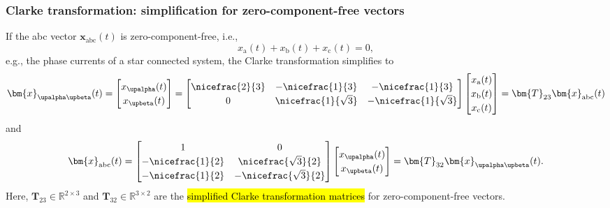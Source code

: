 \begin{frame}
    \frametitle{Clarke transformation: simplification for zero-component-free vectors}
    If the abc vector $\bm{x}_\mathrm{abc}(t)$ is zero-component-free, i.e.,  $$x_\mathrm{a}(t) + x_\mathrm{b}(t) +x_\mathrm{c}(t) = 0,$$
    e.g., the phase currents of a star connected system, \pause the Clarke transformation simplifies to
    \begin{equation}
        \renewcommand{\arraystretch}{1.2}
        \bm{x}_{\upalpha \upbeta}(t) = \begin{bmatrix} x_\upalpha(t) \\ x_\upbeta(t) \end{bmatrix} =\begin{bmatrix}
            \nicefrac{2}{3} & -\nicefrac{1}{3}       & -\nicefrac{1}{3}        \\
            0               & \nicefrac{1}{\sqrt{3}} & -\nicefrac{1}{\sqrt{3}}
        \end{bmatrix} \begin{bmatrix} x_\mathrm{a}(t) \\ x_\mathrm{b}(t) \\ x_\mathrm{c}(t)\end{bmatrix} = \bm{T}_{23} \bm{x}_\mathrm{abc}(t)
        \label{eq:Clarke_transformation_zero_component_free}
    \end{equation}
    \pause
    and
    \begin{equation}
        \renewcommand{\arraystretch}{1.2}
        \bm{x}_\mathrm{abc}(t)  = \begin{bmatrix}
            1                & 0                       \\
            -\nicefrac{1}{2} & \nicefrac{\sqrt{3}}{2}  \\
            -\nicefrac{1}{2} & -\nicefrac{\sqrt{3}}{2}
        \end{bmatrix} \begin{bmatrix} x_\upalpha(t) \\ x_\upbeta(t) \end{bmatrix} = \bm{T}_{32} \bm{x}_{\upalpha \upbeta}(t).
        \label{eq:Clarke_transformation_zero_component_free_inverse}
    \end{equation}
    Here, $\bm{T}_{23}\in\mathbb{R}^{2\times 3}$ and $\bm{T}_{32}\in\mathbb{R}^{3\times 2}$ are the \hl{simplified Clarke transformation matrices} for zero-component-free vectors.
\end{frame}

